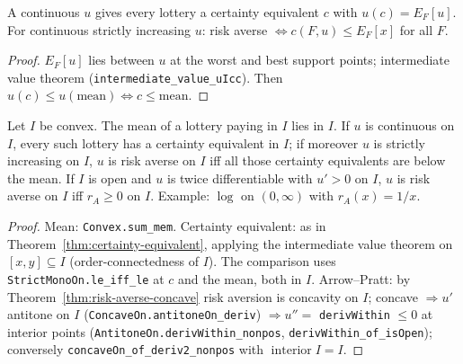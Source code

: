 \begin{theorem}
\label{thm:certainty-equivalent}
\leanok
{}
A continuous $u$ gives every lottery a certainty equivalent $c$ with $u(c) = E_F[u]$. For continuous
strictly increasing $u$: risk averse $\iff c(F,u) \le E_F[x]$ for all $F$.
\end{theorem}
\begin{proof}
\leanok
$E_F[u]$ lies between $u$ at the worst and best support points; intermediate value theorem
(\texttt{intermediate\_value\_uIcc}). Then $u(c) \le u(\text{mean}) \iff c \le \text{mean}$.
\end{proof}

\begin{theorem}
\label{thm:risk-averse-interval}
\leanok
{}
Let $I$ be convex. The mean of a lottery paying in $I$ lies in $I$. If $u$ is continuous on $I$, every such
lottery has a certainty equivalent in $I$; if moreover $u$ is strictly increasing on $I$, $u$ is risk averse on
$I$ iff all those certainty equivalents are below the mean. If $I$ is open and $u$ is twice differentiable with
$u' > 0$ on $I$, $u$ is risk averse on $I$ iff $r_A \ge 0$ on $I$. Example: $\log$ on $(0,\infty)$ with
$r_A(x) = 1/x$.
\end{theorem}
\begin{proof}
\leanok
Mean: \texttt{Convex.sum\_mem}. Certainty equivalent: as in Theorem~\ref{thm:certainty-equivalent}, applying the
intermediate value theorem on $[x, y] \subseteq I$ (order-connectedness of $I$). The comparison uses
\texttt{StrictMonoOn.le\_iff\_le} at $c$ and the mean, both in $I$. Arrow--Pratt: by
Theorem~\ref{thm:risk-averse-concave} risk aversion is concavity on $I$; concave $\Rightarrow u'$ antitone on $I$
(\texttt{ConcaveOn.antitoneOn\_deriv}) $\Rightarrow u'' = $ \texttt{derivWithin} $\le 0$ at interior points
(\texttt{AntitoneOn.derivWithin\_nonpos}, \texttt{derivWithin\_of\_isOpen}); conversely
\texttt{concaveOn\_of\_deriv2\_nonpos} with $\operatorname{interior} I = I$.
\end{proof}

